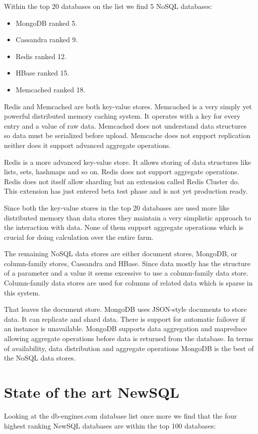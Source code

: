 Within the top 20 databases on the list we find 5 NoSQL databases:

\begin{itemize}
\item MongoDB ranked 5.
\item Cassandra ranked 9.
\item Redis ranked 12.
\item HBase ranked 15.
\item Memcached ranked 18.
\end{itemize}

Redis and Memcached are both key-value stores. Memcached is a very simply yet powerful distributed memory caching system.
It operates with a key for every entry and a value of raw data.
Memcached does not understand data structures so data must be serialized before upload.
Memcache does not support replication neither does it support advanced aggregate operations.

Redis is a more advanced key-value store.
It allows storing of data structures like lists, sets, hashmaps and so on.
Redis does not support aggregate operations.
Redis does not itself allow sharding but an extension called Redis Cluster do. This extension has just entered beta test phase and is not yet production ready.

Since both the key-value stores in the top 20 databases are used more like distributed memory than data stores they maintain a very simplistic approach to the interaction with data.
None of them support aggregate operations which is crucial for doing calculation over the entire farm.

The remaining NoSQL data stores are either document stores, MongoDB, or column-family stores, Cassandra and HBase.
Since data mostly has the structure of a parameter and a value it seems excessive to use a column-family data store. 
Column-family data stores are used for columns of related data which is sparse in this system.

That leaves the document store. MongoDB uses JSON-style documents to store data.
It can replicate and shard data. 
There is support for automatic failover if an instance is unavailable.
MongoDB supports data aggregation and mapreduce allowing aggregate operations before data is returned from the database.
In terms of availability, data distribution and aggregate operations MongoDB is the best of the NoSQL data stores.

\section{State of the art NewSQL}
Looking at the db-engines.com database list once more we find that the four highest ranking NewSQL databases are within the top 100 databases:

